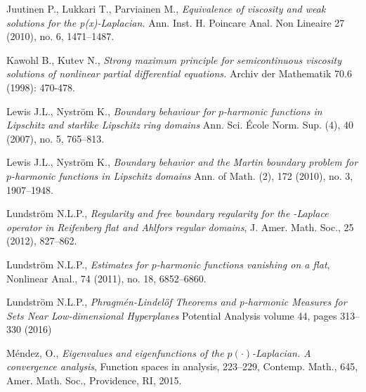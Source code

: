 \documentclass[12pt]{article}
\numberwithin{komcounter}{section}
\begin{document}
\begin{thebibliography}{A}
Juutinen P., Lukkari T., Parviainen M.,
\emph{Equivalence of viscosity and weak solutions for the p(x)-Laplacian.}
Ann. Inst. H. Poincare Anal. Non Lineaire 27 (2010), no. 6, 1471--1487.

Kawohl B., Kutev N.,
\emph{Strong maximum principle for semicontinuous viscosity solutions of nonlinear partial differential equations.}
Archiv der Mathematik 70.6 (1998): 470-478.


Lewis J.L., Nystr\"om K.,
\emph{Boundary behaviour for $p$-harmonic functions in Lipschitz and starlike Lipschitz ring domains} Ann. Sci. \'Ecole Norm. Sup. (4), 40 (2007), no. 5, 765--813.


Lewis J.L., Nystr\"om K.,
\emph{Boundary behavior and the Martin boundary problem for $p$-harmonic functions in Lipschitz domains} Ann. of Math. (2), 172 (2010), no. 3, 1907--1948.

Lundstr\"om N.L.P.,
\emph{Regularity and free boundary regularity for the -Laplace operator in Reifenberg flat and Ahlfors regular domains}, J. Amer. Math. Soc., 25 (2012), 827--862.

Lundstr\"om N.L.P.,
\emph{Estimates for $p$-harmonic functions vanishing on a flat}, Nonlinear Anal., 74 (2011), no. 18, 6852--6860.

Lundstr\"om N.L.P.,
\emph{Phragmén-Lindelöf Theorems and p-harmonic Measures for Sets Near Low-dimensional Hyperplanes}
Potential Analysis volume 44, pages 313--330 (2016)


M\'endez, O.,
\emph{Eigenvalues and eigenfunctions of the $p(\cdot)$-Laplacian. A convergence analysis},
Function spaces in analysis, 223--229,
Contemp. Math., 645, Amer. Math. Soc., Providence, RI, 2015.



\end{thebibliography}
\end{document}
